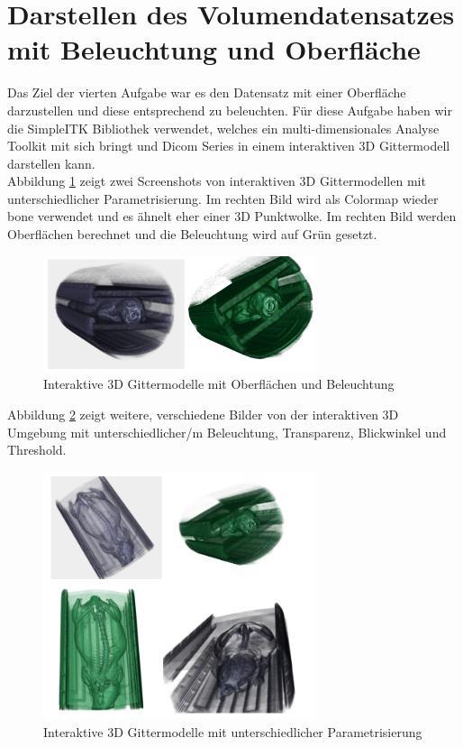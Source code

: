 \documentclass[conference]{IEEEtran}
\begin{document}
\section{Darstellen des Volumendatensatzes mit Beleuchtung und Oberfläche}
Das Ziel der vierten Aufgabe war es den Datensatz mit einer Oberfläche darzustellen und diese entsprechend zu beleuchten. Für diese Aufgabe haben wir die SimpleITK Bibliothek\cite{sitk} verwendet, welches ein multi-dimensionales Analyse Toolkit mit sich bringt und Dicom Series in einem interaktiven 3D Gittermodell darstellen kann. \\
Abbildung \ref{sitk_blue_green} zeigt zwei Screenshots von interaktiven 3D Gittermodellen mit unterschiedlicher Parametrisierung. Im rechten Bild wird als Colormap wieder bone verwendet und es ähnelt eher einer 3D Punktwolke. Im rechten Bild werden Oberflächen berechnet und die Beleuchtung wird auf Grün gesetzt.

\begin{figure}[H]
	\begin{center}
		\includegraphics[width=8cm]{latex/images/sitk_blue_green.png}
	 	\caption{Interaktive 3D Gittermodelle mit Oberflächen und Beleuchtung}
	 	\label{sitk_blue_green}
	\end{center}
\end{figure}

Abbildung \ref{sitk_other} zeigt weitere, verschiedene Bilder von der interaktiven 3D Umgebung mit unterschiedlicher/m Beleuchtung, Transparenz, Blickwinkel und Threshold.

\begin{figure}[H]
	\begin{center}
		\includegraphics[width=8cm]{latex/images/sitk_other.png}
	 	\caption{Interaktive 3D Gittermodelle mit unterschiedlicher Parametrisierung}
	 	\label{sitk_other}
	\end{center}
\end{figure}
\end{document}

